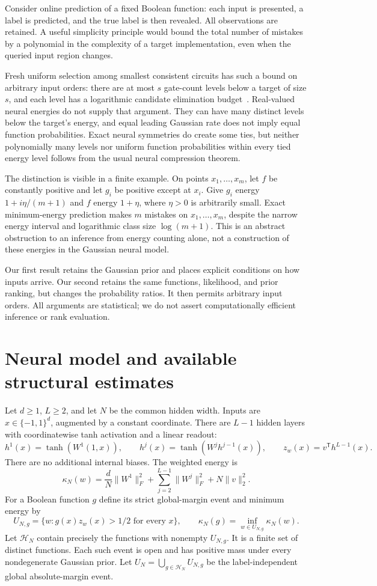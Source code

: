 \documentclass[11pt]{article}
\begin{document}
Consider online prediction of a fixed Boolean function: each input is
presented, a label is predicted, and the true label is then revealed.
All observations are retained. A useful simplicity principle would bound
the total number of mistakes by a polynomial in the complexity of a
target implementation, even when the queried input region changes.

Fresh uniform selection among smallest consistent circuits has such a
bound on arbitrary input orders: there are at most $s$ gate-count levels
below a target of size $s$, and each level has a logarithmic candidate
elimination budget~\cite{occam}. Real-valued neural energies do not supply
that argument. They can have many distinct levels below the target's
energy, and equal leading Gaussian rate does not imply equal function
probabilities. Exact neural symmetries do create some ties, but neither
polynomially many levels nor uniform function probabilities within every tied energy level
follows from the usual neural compression theorem.

The distinction is visible in a finite example. On points
$x_1,\ldots,x_m$, let $f$ be constantly positive and let $g_i$ be positive
except at $x_i$. Give $g_i$ energy $1+i\eta/(m+1)$ and $f$ energy
$1+\eta$, where $\eta>0$ is arbitrarily small. Exact minimum-energy
prediction makes $m$ mistakes on $x_1,\ldots,x_m$, despite the narrow
energy interval and logarithmic class size $\log(m+1)$. This is an
abstract obstruction to an inference from energy counting alone, not a
construction of these energies in the Gaussian neural model.

Our first result retains the Gaussian prior and places explicit
conditions on how inputs arrive. Our second retains the same functions,
likelihood, and prior ranking, but changes the probability ratios.
It then permits arbitrary input orders. All arguments are statistical;
we do not assert computationally efficient inference or rank evaluation.

\section{Neural model and available structural estimates}

Let $d\ge1$, $L\ge2$, and let $N$ be the common hidden width. Inputs are
$x\in\{-1,1\}^d$, augmented by a constant coordinate. There are $L-1$
hidden layers with coordinatewise tanh activation and a linear readout:
\[
 h^1(x)=\tanh(W^1(1,x)),\qquad
 h^j(x)=\tanh(W^jh^{j-1}(x)),\qquad
 z_w(x)=v^{\mathsf T}h^{L-1}(x).
\]
There are no additional internal biases. The weighted energy is
\[
 \kappa_N(w)=\frac dN\|W^1\|_F^2
       +\sum_{j=2}^{L-1}\|W^j\|_F^2+N\|v\|_2^2.
\]
For a Boolean function $g$ define its strict global-margin event and
minimum energy by
\[
 U_{N,g}=\{w:g(x)z_w(x)>1/2\text{ for every }x\},\qquad
 \kappa_N(g)=\inf_{w\in U_{N,g}}\kappa_N(w).
\]
Let $\mathcal H_N$ contain precisely the functions with nonempty
$U_{N,g}$. It is a finite set of distinct functions. Each such event is
open and has positive mass under every nondegenerate Gaussian prior.
Let $U_N=\bigcup_{g\in\mathcal H_N}U_{N,g}$ be the label-independent
global absolute-margin event.
\end{document}
